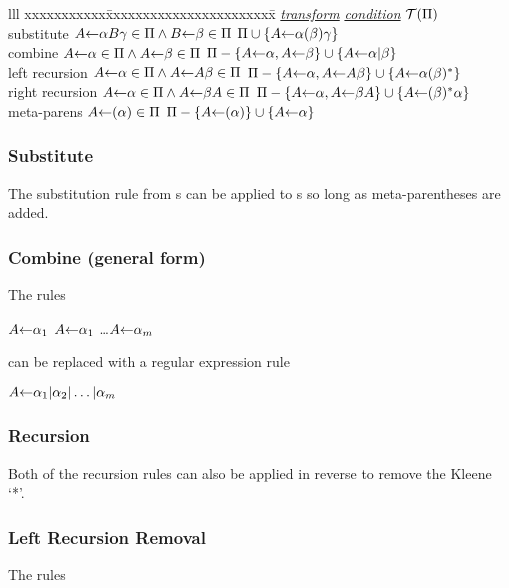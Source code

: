 \begin{samepage}
\begin{tabbing}{lll}
xxxxxxxxxxx\=xxxxxxxxxxxxxxxxxxxxxxx\=\kill
\underline{\em transform}
  \>\quad\underline{\em condition} 
  \>\quad\underline{${\cal T}(\Pi)$}                       \\
substitute
  \> $A\mbox{$\leftarrow$}\alpha B\gamma\in\Pi\wedge B\mbox{$\leftarrow$}\beta\in\Pi$
  \> $\Pi \cup \{ A\mbox{$\leftarrow$}\alpha(\beta)\gamma \}$            \\
combine
  \> $A\mbox{$\leftarrow$}\alpha\in \Pi\wedge A\mbox{$\leftarrow$}\beta\in\Pi$
  \> $\Pi-\{A\mbox{$\leftarrow$}\alpha, A\mbox{$\leftarrow$}\beta\}\cup\{A\mbox{$\leftarrow$}\alpha|\beta\}$\\
left recursion
  \> $A\mbox{$\leftarrow$}\alpha\in \Pi\wedge A\mbox{$\leftarrow$} A \beta\in\Pi$
  \> $\Pi-\{A\mbox{$\leftarrow$}\alpha, A\mbox{$\leftarrow$} A\beta\}\cup\{A\mbox{$\leftarrow$}\alpha(\beta)^*\}$\\
right recursion
  \> $A\mbox{$\leftarrow$}\alpha\in \Pi\wedge A\mbox{$\leftarrow$}\beta A\in\Pi$
  \> $\Pi-\{A\mbox{$\leftarrow$}\alpha, A\mbox{$\leftarrow$}\beta A\}\cup\{A\mbox{$\leftarrow$}(\beta)^*\alpha\}$\\
meta-parens
  \> $A\mbox{$\leftarrow$}(\alpha)\in \Pi$
  \> $\Pi-\{A\mbox{$\leftarrow$}(\alpha)\}\cup\{A\mbox{$\leftarrow$}\alpha\}$                    \\
\end{tabbing}
\end{samepage}

\subsubsection{Substitute}

The substitution rule from {\cfg}s can be applied to {\reg}s 
so long as meta-parentheses are added.

\subsubsection{Combine (general form)}

The rules

$A\mbox{$\leftarrow$}\alpha_1$ \quad $A\mbox{$\leftarrow$}\alpha_1$ \ldots $A\mbox{$\leftarrow$}\alpha_m$

\noindent
can be replaced with a regular expression rule

$A\mbox{$\leftarrow$} \alpha_1|\alpha_2|\ldots|\alpha_m$

\subsubsection{Recursion}
Both of the recursion rules can also be applied in reverse to remove
the Kleene `*'.

\subsubsection{Left Recursion Removal}
The rules

